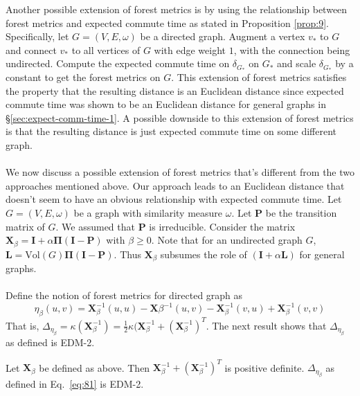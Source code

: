Another possible extension of forest metrics is by using the
relationship between forest metrics and expected commute time as
stated in Proposition \ref{prop:9}. Specifically, let $G =
(V,E,\omega)$ be a directed graph. Augment a vertex $v_{*}$ to $G$ and
connect $v_{*}$ to all vertices of $G$ with edge weight $1$, with the
connection being undirected. Compute the expected commute time on
$\delta_{G_{*}}$ on $G_*$ and scale $\delta_{G_{*}}$ by a constant to
get the forest metrics on $G$. This extension of forest metrics
satisfies the property that the resulting distance is an Euclidean
distance since expected commute time was shown to be an Euclidean
distance for general graphs in \S \ref{sec:expect-comm-time-1}. A
possible downside to this extension of forest metrics is that the
resulting distance is just expected commute time on some
different graph. \\ \\  
%
%
\noindent 
We now discuss a possible extension of forest metrics that's different
from the two approaches mentioned above. Our approach leads to an
Euclidean distance that doesn't seem to have an obvious relationship
with expected commute time. Let $G = (V,E,\omega)$ be a graph with
similarity measure $\omega$. Let $\mathbf{P}$ be the transition matrix
of $G$. We assumed that $\mathbf{P}$ is irreducible. Consider the
matrix $\mathbf{X}_{\beta} = \mathbf{I} + \alpha \bm{\Pi}(\mathbf{I} -
\mathbf{P})$ with $\beta \geq 0$. Note that for an undirected graph
$G$, $\mathbf{L} = \mathrm{Vol}(G) \bm{\Pi}(\mathbf{I} -
\mathbf{P})$. Thus $\mathbf{X}_{\beta}$ subsumes the role of
$(\mathbf{I} + \alpha \mathbf{L})$ for general graphs. \\ \\
%
%
Define the notion of forest metrics for directed graph as
\begin{equation}
  \label{eq:81}
  \eta_{\beta}(u,v) = \mathbf{X}_\beta^{-1}(u,u) - \mathbf{X}\beta^{-1}(u,v) -
  \mathbf{X}_\beta^{-1}(v,u) + \mathbf{X}_\beta^{-1}(v,v) 
\end{equation}
That is, $\Delta_{\eta_{\beta}} = \kappa(\mathbf{X}_\beta^{-1}) =
\tfrac{1}{2}\kappa(\mathbf{X}_\beta^{-1} +
(\mathbf{X}_{\beta}^{-1})^{T}$. The next result shows that
$\Delta_{\eta_{\beta}}$ as defined is EDM-2.
\begin{proposition}
  \label{prop:23}
  Let $\mathbf{X}_{\beta}$ be defined as above. Then
  $\mathbf{X}_{\beta}^{-1} + (\mathbf{X}_{\beta}^{-1})^{T}$ is
  positive definite. $\Delta_{\eta_{\beta}}$ as defined in
  Eq.~\eqref{eq:81} is EDM-2.
\end{proposition}
